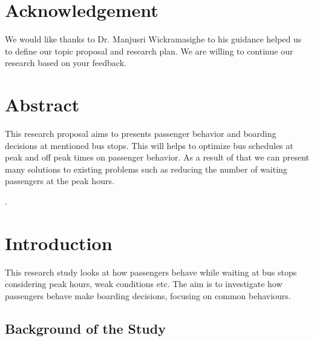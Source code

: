 \documentclass[12pt,a4paper]{report}
\begin{document}
\chapter*{Acknowledgement}

We would like thanks to Dr. Manjusri Wickramasighe to his guidance  helped us to define our topic proposal and research plan. We are willing to continue our research based on your feedback.
\clearpage

\chapter*{Abstract}
This research proposal aims to presents passenger behavior and boarding decisions at mentioned bus stops. This will helps to optimize bus schedules at peak and off peak times on passenger behavior.  As a result of that we can present many solutions to existing problems such as reducing the number of waiting passengers at the peak hours.

\clearpage
{}
\setcounter{page}{1}
\setcounter{secnumdepth}{-1}


\tableofcontents

.
\setcounter{page}{1}
\setcounter{secnumdepth}{3}



\chapter{Introduction}

This research study looks at how passengers behave while waiting at bus stops considering peak hours, weak  conditions etc. The aim is to investigate how passengers behave make boarding decisions, focusing on common behaviours.


\section{Background of the Study}
\end{document}
